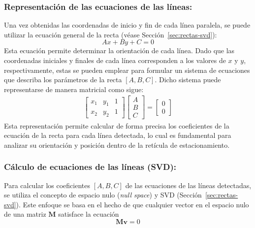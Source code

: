 \subsubsection{Representación de las ecuaciones de las líneas:}
\noindent
Una vez obtenidas las coordenadas de inicio y fin de cada línea paralela, se puede utilizar la ecuación general de la recta (véase Sección~\ref{sec:rectas-svd}):
\begin{equation}
    Ax + By + C = 0
\end{equation}
Esta ecuación permite determinar la orientación de cada línea.
Dado que las coordenadas iniciales y finales de cada línea corresponden a los valores de $x$ y $y$, respectivamente,
estas se pueden emplear para formular un sistema de ecuaciones que describa los parámetros de la recta $[A, B, C]$.
Dicho sistema puede representarse de manera matricial como sigue:
\begin{equation}
    \begin{aligned}
        \left[\begin{array}{ccc}
                      x_1 & y_1 & 1 \\
                      x_2 & y_2 & 1
                  \end{array}\right]
        \begin{bmatrix}
            A \\
            B \\
            C
        \end{bmatrix}
        =
        \begin{bmatrix}
            0 \\
            0
        \end{bmatrix}
    \end{aligned}
\end{equation}
\noindent
Esta representación permite calcular de forma precisa los coeficientes de la ecuación de la recta para cada línea detectada,
lo cual es fundamental para analizar su orientación y posición dentro de la retícula de estacionamiento.

\subsubsection{Cálculo de ecuaciones de las líneas (SVD):}
\noindent
Para calcular los coeficientes $[A, B, C]$ de las ecuaciones de las líneas detectadas, se utiliza el concepto de espacio nulo (\emph{null space}) y SVD (Sección~\ref{sec:rectas-svd}).
Este enfoque se basa en el hecho de que cualquier vector en el espacio nulo de una matriz $\mathbf{M}$ satisface la ecuación
\begin{equation}
    \mathbf{Mv} = 0
\end{equation}

